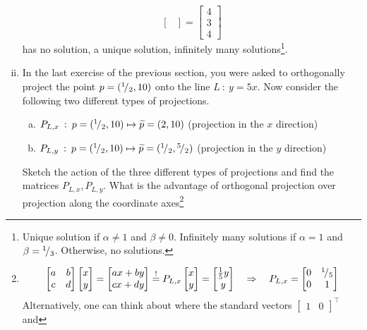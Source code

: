 \begin{exercise}
\begin{enumerate}[(i)]
\[\begin{bmatrix}
	\end{bmatrix} = \begin{bmatrix} 4 \\ 3 \\ 4	\end{bmatrix} \]
	has no solution, a unique solution, infinitely many solutions\footnote{Unique solution if $\alpha\not=1$ and $\beta\not=0$. Infinitely many solutions if $\alpha=1$ and $\beta={}^{1}\!/_{3}$. Otherwise, no solutions.}.
	\item In the last exercise of the previous section, you were asked to orthogonally project the point $p=({}^{1}\!/_{2},10)$ onto the line $L \: : \: y=5x$. Now consider the following two different types of projections.
	\begin{enumerate}[(a)]
		\item $P_{L,x} \: : \: p=({}^{1}\!/_{2},10) \mapsto \widetilde{p}=(2,10)$ 
				\hfill \text(projection in the $x$ direction)
		\item $P_{L,y} \: : \: p=({}^{1}\!/_{2},10) \mapsto \widetilde{p}=({}^{1}\!/_{2},{}^{5}\!/_{2})$
				\hfill \text(projection in the $y$ direction)
\end{enumerate}
	Sketch the action of the three different types of projections and find the matrices $P_{L,x},P_{L,y}$. What is the advantage of orthogonal projection over projection along the coordinate axes\footnote{\[
		\begin{bmatrix} a & b \\ c & d \end{bmatrix} \begin{bmatrix} x \\ y \end{bmatrix} 
		= \begin{bmatrix} ax+by \\ cx+dy \end{bmatrix} \stackrel{\text{!}}{=}
		P_{L,x} \begin{bmatrix} x \\ y \end{bmatrix}
		= \begin{bmatrix} \frac15y \\ y \end{bmatrix} 
		\quad \Rightarrow \quad 
		P_{L,x} = \begin{bmatrix} 0 & {}^{1}\!/_{5} \\ 0 & 1 \end{bmatrix} \]
	Alternatively, one can think about where the standard vectors 
	$\begin{bmatrix} 1 & 0 \end{bmatrix}^\top$ and
}
\end{enumerate}
\end{exercise}

